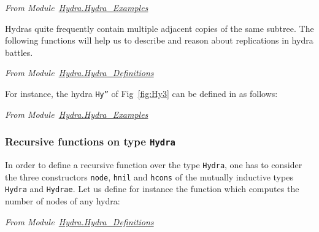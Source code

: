 \vspace{4mm}
\noindent
\emph{From Module~\href{../theories/html/hydras.Hydra.Hydra_Examples.html\#Hy}{Hydra.Hydra\_Examples}}





Hydras quite frequently contain  multiple adjacent  copies of the same subtree. The following functions
will help us to describe and reason about replications in hydra battles.

\vspace{4pt}
\noindent
\emph{From Module~\href{../theories/html/hydras.Hydra.Hydra_Definitions.html\#hcons_mult}{Hydra.Hydra\_Definitions}}





\vspace{4mm}



For instance, the hydra \texttt{Hy''} of Fig~\vref{fig:Hy3}  can be defined in \coq{} as follows:

\vspace{4pt}
\noindent
\emph{From Module~\href{../theories/html/hydras.Hydra.Hydra_Examples.html}{Hydra.Hydra\_Examples}}








\subsubsection{Recursive functions on type \texttt{Hydra}}
\label{sec:orgheadline41}
\label{sec:hsize-def}




In order to  define a recursive function over the type \texttt{Hydra}, one has to consider the three constructors 
\texttt{node}, \texttt{hnil} and \texttt{hcons} of the mutually inductive types \texttt{Hydra} and \texttt{Hydrae}. 
Let us define for instance the function which  computes the number of nodes of any hydra:

\vspace{4pt}
\noindent
\emph{From Module~\href{../theories/html/hydras.Hydra.Hydra_Definitions.html}{Hydra.Hydra\_Definitions}}






